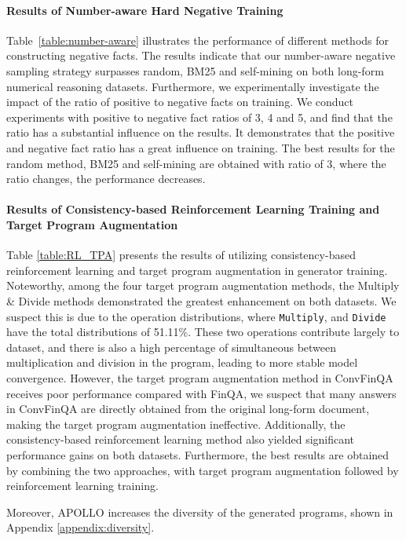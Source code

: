\documentclass[11pt]{article}
\begin{document}
\paragraph{Results of Number-aware Hard Negative Training}
Table~\ref{table:number-aware} illustrates the performance of different methods for constructing negative facts. The results indicate that our number-aware negative sampling strategy surpasses random, BM25 and self-mining on both long-form numerical reasoning datasets. Furthermore, we experimentally investigate the impact of the ratio of positive to negative facts on training. We conduct experiments with positive to negative fact ratios of 3, 4 and 5, and find that the ratio has a substantial influence on the results. It demonstrates that the positive and negative fact ratio has a great influence on training. The best results for the random method, BM25 and self-mining are obtained with ratio of 3, where the ratio changes, the performance decreases. 



\paragraph{Results of Consistency-based Reinforcement Learning Training and Target Program Augmentation}
Table \ref{table:RL_TPA} presents the results of utilizing consistency-based reinforcement learning and target program augmentation in generator training. Noteworthy, among the four target program augmentation methods, the Multiply \& Divide methods demonstrated the greatest enhancement on both datasets. We suspect this is due to the operation distributions, where \texttt{Multiply}, and \texttt{Divide} have the total distributions of 51.11\%. These two operations contribute largely to dataset, and there is also a high percentage of simultaneous between multiplication and division in the program, leading to more stable model convergence. However, the target program augmentation method in ConvFinQA receives poor performance compared with FinQA, we suspect that many answers in ConvFinQA are directly obtained from the original long-form document, making the target program augmentation ineffective. Additionally, the consistency-based reinforcement learning method also yielded significant performance gains on both datasets. Furthermore, the best results are obtained by combining the two approaches, with target program augmentation followed by reinforcement learning training.

Moreover, APOLLO increases the diversity of the generated programs, shown in Appendix \ref{appendix:diversity}.
\end{document}
